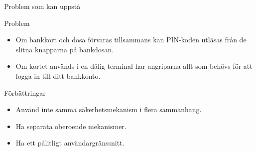 \begin{frame}{Problem som kan uppstå}
  \begin{block}{Problem}
    \begin{itemize}
      \item Om bankkort och dosa förvaras tillsammans kan PIN-koden utläsas 
        från de slitna knapparna på bankdosan.
      \item Om kortet används i en dålig terminal har angriparna allt som 
        behövs för att logga in till ditt bankkonto.
    \end{itemize}
  \end{block}

  \pause{}

  \begin{block}{Förbättringar}
    \begin{itemize}
      \item Använd inte samma säkerhetsmekanism i flera sammanhang.
      \item Ha separata oberoende mekanismer.
      \item Ha ett pålitligt användargränssnitt.
    \end{itemize}
  \end{block}
\end{frame}




\begin{frame}
	\small
  \printbibliography
\end{frame}

